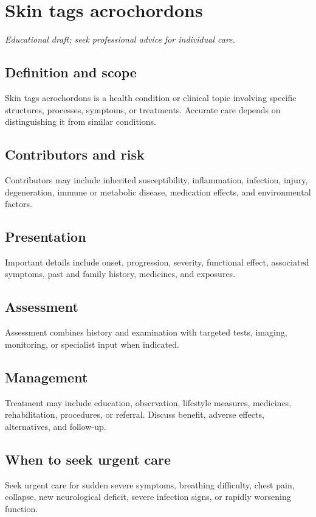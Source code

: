 \chapter{Skin tags acrochordons}
\medskip
\noindent\textit{Educational draft; seek professional advice for individual care.}

\section*{Definition and scope}
Skin tags acrochordons is a health condition or clinical topic involving specific structures, processes, symptoms, or treatments. Accurate care depends on distinguishing it from similar conditions.

\section*{Contributors and risk}
Contributors may include inherited susceptibility, inflammation, infection, injury, degeneration, immune or metabolic disease, medication effects, and environmental factors.

\section*{Presentation}
Important details include onset, progression, severity, functional effect, associated symptoms, past and family history, medicines, and exposures.

\section*{Assessment}
Assessment combines history and examination with targeted tests, imaging, monitoring, or specialist input when indicated.

\section*{Management}
Treatment may include education, observation, lifestyle measures, medicines, rehabilitation, procedures, or referral. Discuss benefit, adverse effects, alternatives, and follow-up.

\section*{When to seek urgent care}
Seek urgent care for sudden severe symptoms, breathing difficulty, chest pain, collapse, new neurological deficit, severe infection signs, or rapidly worsening function.

